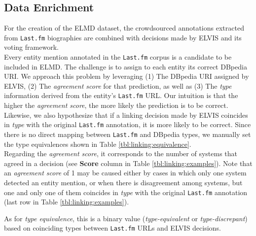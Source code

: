 


\subsection{Data Enrichment}
\label{sec:linking:enrichment}

For the creation of the ELMD dataset, the crowdsourced annotations extracted from \texttt{Last.fm} biographies are combined with decisions made by \textsc{ELVIS} and its voting framework.\\%

Every entity mention annotated in the \texttt{Last.fm} corpus is a candidate to be included in \textsc{ELMD}. The challenge is to assign to each entity its correct DBpedia URI. We approach this problem by leveraging (1) The DBpedia URI assigned by \textsc{ELVIS}, (2) The \textit{agreement score} for that prediction, as well as (3) The \textit{type} information derived from the entity's \texttt{Last.fm} URL. Our intuition is that the higher the \textit{agreement score}, the more likely the prediction is to be correct. Likewise, we also hypothesize that if a linking decision made by \textsc{ELVIS} coincides in \textit{type} with the original \texttt{Last.fm} annotation, it is more likely to be correct. Since there is no direct mapping between \texttt{Last.fm} and DBpedia types, we manually set the type equivalences shown in Table \ref{tbl:linking:equivalence}.\\

Regarding the \textit{agreement score}, it corresponds to the number of systems that agreed in a decision (see \textbf{Score} column in Table \ref{tbl:linking:examples}). Note that an \textit{agreement score} of 1 may be caused either by cases in which only one system detected an entity mention, or when there is disagreement among systems, but one and only one of them coincides in \textit{type} with the original \texttt{Last.fm} annotation (last row in Table \ref{tbl:linking:examples}).

As for \textit{type equivalence}, this is a binary value (\textit{type-equivalent} or \textit{type-discrepant}) based on coinciding types between \texttt{Last.fm} URLs and \textsc{ELVIS} decisions.

